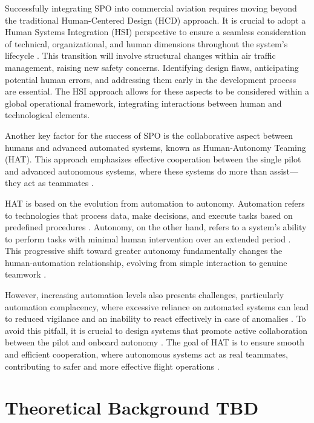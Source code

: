 \documentclass[12pt,a4paper]{article} %
\begin{document}
	Successfully integrating SPO into commercial aviation requires moving beyond the traditional Human-Centered Design (HCD) approach. It is crucial to adopt a Human Systems Integration (HSI) perspective to ensure a seamless consideration of technical, organizational, and human dimensions throughout the system's lifecycle \parencite{boy_prodec_2024}. This transition will involve structural changes within air traffic management, raising new safety concerns. Identifying design flaws, anticipating potential human errors, and addressing them early in the development process are essential. The HSI approach allows for these aspects to be considered within a global operational framework, integrating interactions between human and technological elements.
	
	Another key factor for the success of SPO is the collaborative aspect between humans and advanced automated systems, known as Human-Autonomy Teaming (HAT). This approach emphasizes effective cooperation between the single pilot and advanced autonomous systems, where these systems do more than assist—they act as teammates \parencite{shively_autonomy_2017}.
	
	HAT is based on the evolution from automation to autonomy. Automation refers to technologies that process data, make decisions, and execute tasks based on predefined procedures \parencite{hoff_trust_2015, hancock_imposing_2017}. Autonomy, on the other hand, refers to a system’s ability to perform tasks with minimal human intervention over an extended period \parencite{endsley_here_2017, holbrook_enabling_2020}. This progressive shift toward greater autonomy fundamentally changes the human-automation relationship, evolving from simple interaction to genuine teamwork \parencite{endsley_here_2017}.
	
	However, increasing automation levels also presents challenges, particularly automation complacency, where excessive reliance on automated systems can lead to reduced vigilance and an inability to react effectively in case of anomalies \parencite{lee_design_2023}. To avoid this pitfall, it is crucial to design systems that promote active collaboration between the pilot and onboard autonomy \parencite{endsley_here_2017}. The goal of HAT is to ensure smooth and efficient cooperation, where autonomous systems act as real teammates, contributing to safer and more effective flight operations \parencite{mcneese_chapter_2020}.
	
	\section{Theoretical Background \textbf{TBD}}
\end{document}
